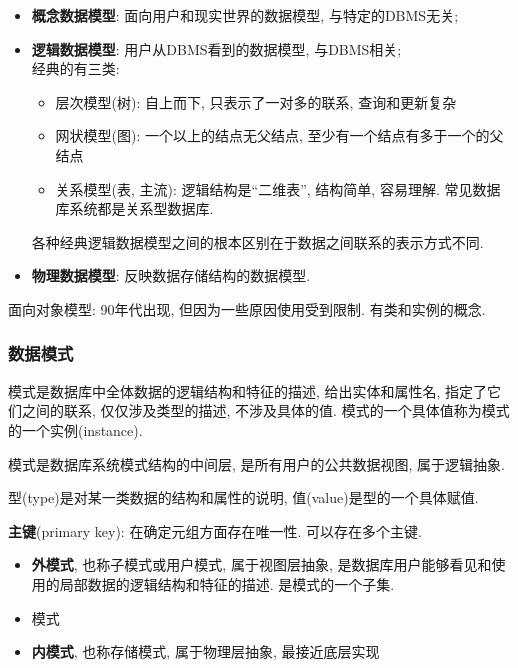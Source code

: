             \begin{itemize}
                \item \textbf{概念数据模型}: 面向用户和现实世界的数据模型, 与特定的DBMS无关;
                \item \textbf{逻辑数据模型}: 用户从DBMS看到的数据模型, 与DBMS相关; \\
                    经典的有三类: 
                    \begin{itemize}
                        \item 层次模型(树): 自上而下, 只表示了一对多的联系, 查询和更新复杂
                        \item 网状模型(图): 一个以上的结点无父结点, 至少有一个结点有多于一个的父结点
                        \item 关系模型(表, 主流): 逻辑结构是``二维表'', 结构简单, 容易理解. 常见数据库系统都是关系型数据库.
                    \end{itemize}
                    各种经典逻辑数据模型之间的根本区别在于数据之间联系的表示方式不同.
                \item \textbf{物理数据模型}: 反映数据存储结构的数据模型.
            \end{itemize}

            面向对象模型: 90年代出现, 但因为一些原因使用受到限制. 有类和实例的概念. 

        \subsubsection{数据模式}

            模式是数据库中全体数据的逻辑结构和特征的描述, 给出实体和属性名, 指定了它们之间的联系, 仅仅涉及类型的描述, 不涉及具体的值. 模式的一个具体值称为模式的一个实例(instance).

            模式是数据库系统模式结构的中间层, 是所有用户的公共数据视图, 属于逻辑抽象.

            型(type)是对某一类数据的结构和属性的说明, 值(value)是型的一个具体赋值.

            \textbf{主键}(primary key): 在确定元组方面存在唯一性. 可以存在多个主键.

            \begin{itemize}
                \item \textbf{外模式}, 也称子模式或用户模式, 属于视图层抽象, 是数据库用户能够看见和使用的局部数据的逻辑结构和特征的描述. 是模式的一个子集.
                \item 模式
                \item \textbf{内模式}, 也称存储模式, 属于物理层抽象, 最接近底层实现
            \end{itemize}

